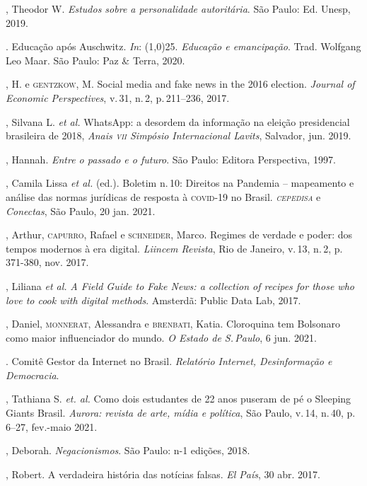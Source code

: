 \begin{bibliohedra}
, Theodor W. \textit{Estudos sobre a personalidade autoritária}. São Paulo: Ed. Unesp, 2019.

\titidem. Educação após Auschwitz. \textit{In}: \line(1,0){25}. \textit{Educação e emancipação}. Trad. Wolfgang Leo Maar. São Paulo: Paz \& Terra, 2020.

, H. e \textsc{gentzkow}, M. Social media and fake news in the
2016 election. \textit{Journal of Economic Perspectives}, v.\,31, n.\,2, p.\,211--236, 2017.

, Silvana L. \textit{et al.} WhatsApp: a desordem da informação na
eleição presidencial brasileira de 2018, \textit{Anais \textsc{vii} Simpósio
Internacional Lavits}, Salvador, jun. 2019.

, Hannah. \textit{Entre o passado e o futuro}. São Paulo: Editora
Perspectiva, 1997.

, Camila Lissa \textit{et al.} (ed.). Boletim n.\,10: Direitos na Pandemia --
mapeamento e análise das normas jurídicas de resposta à \textsc{covid-19} no
Brasil. \textit{\textsc{cepedisa}} e \textit{Conectas}, São Paulo, 20 jan. 2021.

, Arthur, \textsc{capurro}, Rafael e \textsc{schneider}, Marco. Regimes de
verdade e poder: dos tempos modernos à era digital. \textit{Liincem Revista}, Rio de Janeiro, v.\,13, n.\,2, p.\,371-380, nov. 2017.

, Liliana \textit{et al.}
\textit{A Field Guide to Fake News: a collection of recipes for those
who love to cook with digital methods}. Amsterdã: Public Data Lab, 2017.

, Daniel, \textsc{monnerat}, Alessandra e \textsc{brenbati}, Katia.
Cloroquina tem Bolsonaro como maior influenciador do mundo. \textit{O Estado de S.\,Paulo}, 6 jun. 2021.

. Comitê Gestor da Internet no Brasil. \textit{Relatório Internet,
Desinformação e Democracia}.

, Tathiana S. \textit{et. al.} Como dois estudantes de 22 anos puseram de pé o Sleeping Giants Brasil. \textit{Aurora: revista de arte, mídia e política}, São Paulo, v.\,14, n.\,40, p. 6--27, fev.-maio 2021.

, Deborah. \textit{Negacionismos}. São Paulo: n-1 edições, 2018.

, Robert. A verdadeira história das notícias falsas. \textit{El
País}, 30 abr. 2017.


\end{bibliohedra}
